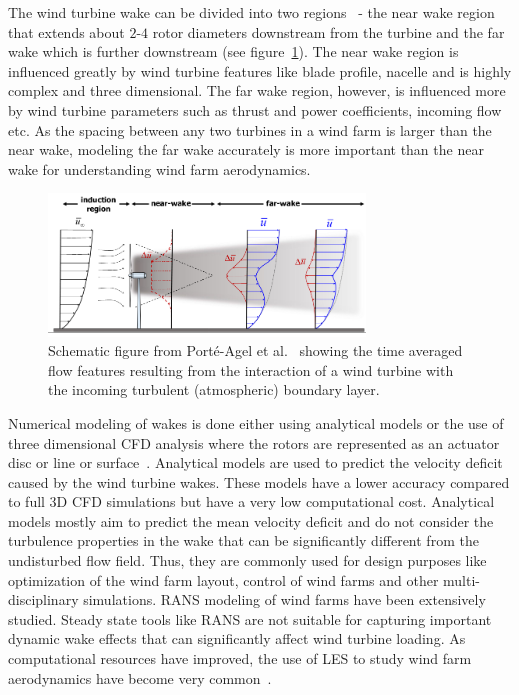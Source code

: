 The wind turbine wake can be divided into two regions~\cite{vermeer2003wind} - the near wake region that extends about $2$-$4$ rotor diameters downstream from the turbine and the far wake which is further downstream (see figure~\ref{fig:ablwake}). The near wake region is influenced greatly by wind turbine features like blade profile, nacelle and is highly complex and three dimensional. The far wake region, however, is influenced more by wind turbine parameters such as thrust and power coefficients, incoming flow etc. As the spacing between any two turbines in a wind farm is larger than the near wake, modeling the far wake accurately is more important than the near wake for understanding wind farm aerodynamics.
\begin{figure}[h!]
\centering
\captionsetup{justification=centering}
\includegraphics[width=0.75\textwidth]{ch1_introduction/images/wake_regions.png}
\caption{Schematic figure from Port{\'e}-Agel et al.~\cite{porte2020wind} showing the time averaged flow features resulting from the interaction of a wind turbine with the incoming turbulent (atmospheric) boundary layer.}
 \label{fig:ablwake}
\end{figure} 


Numerical modeling of wakes is done either using analytical models or the use of three dimensional CFD analysis where the rotors are represented as an actuator disc or line or surface~\cite{sorensonal, sandresereview}. Analytical models are used to predict the velocity deficit caused by the wind turbine wakes. These models have a lower accuracy compared to full 3D CFD simulations but have a very low computational cost. Analytical models mostly aim to predict the mean velocity deficit and do not consider the turbulence properties in the wake that can be significantly different from the undisturbed flow field. Thus, they are commonly used for design purposes like optimization of the wind farm layout, control of wind farms and other multi-disciplinary simulations. RANS modeling of wind farms have been extensively studied. Steady state tools like RANS are not suitable for capturing important dynamic wake effects that can significantly affect wind turbine loading.
As computational resources have improved, the use of LES to study wind farm aerodynamics have become very common~\cite{stevensreview, criticalreview}.

